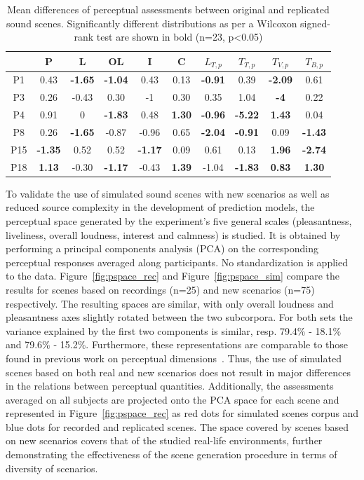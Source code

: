 \documentclass[11pt,a4paper]{article}
\begin{document}
\begin{table}[h]
\centering
\caption{Mean differences of perceptual assessments between original and replicated sound scenes. Significantly different distributions as per a Wilcoxon signed-rank test are shown in bold (n=23, p<0.05)}
\label{tab:ogrep}
\begin{tabular}{ c | c c c c c c c c c }
\hline
	 & P & L & OL & I & C & $L_{T, p}$ & $T_{T, p}$ & $T_{V, p}$ & $T_{B, p}$ \\ \hline
	P1 & 0.43 & \textbf{-1.65} & \textbf{-1.04} & 0.43 & 0.13 & \textbf{-0.91} & 0.39 & \textbf{-2.09} & 0.61 \\
	P3 & 0.26 & -0.43 & 0.30 & -1 & 0.30 & 0.35 & 1.04 & \textbf{-4} & 0.22 \\
	P4 & 0.91 & 0 & \textbf{-1.83} & 0.48 & \textbf{1.30} & \textbf{-0.96} & \textbf{-5.22} & \textbf{1.43} & 0.04 \\
	P8 & 0.26 & \textbf{-1.65} & -0.87 & -0.96 & 0.65 & \textbf{-2.04} & \textbf{-0.91} & 0.09 & \textbf{-1.43} \\
	P15 & \textbf{-1.35} & 0.52 & 0.52 & \textbf{-1.17} & 0.09 & 0.61 & 0.13 & \textbf{1.96} & \textbf{-2.74} \\
	P18 & \textbf{1.13} & -0.30 & \textbf{-1.17} & -0.43 & \textbf{1.39} & -1.04 & \textbf{-1.83} & \textbf{0.83} & \textbf{1.30} \\ \hline
\end{tabular}
\end{table}

To validate the use of simulated sound scenes with new scenarios as well as reduced source complexity in the development of prediction models, the perceptual space generated by the experiment's five general scales (pleasantness, liveliness, overall loudness, interest and calmness) is studied. It is obtained by performing a principal components analysis (PCA) on the corresponding perceptual responses averaged along participants. No standardization is applied to the data. Figure~\ref{fig:pspace_rec} and Figure~\ref{fig:pspace_sim} compare the results for scenes based on recordings (n=25) and new scenarios (n=75) respectively. The resulting spaces are similar, with only overall loudness and pleasantness axes slightly rotated between the two subcorpora. For both sets the variance explained by the first two components is similar, resp. 79.4\% - 18.1\% and 79.6\% - 15.2\%. Furthermore, these representations are comparable to those found in previous work on perceptual dimensions~\cite{axelsson2010, cain2013}. Thus, the use of simulated scenes based on both real and new scenarios does not result in major differences in the relations between perceptual quantities. Additionally, the assessments averaged on all subjects are projected onto the PCA space for each scene and represented in Figure~\ref{fig:pspace_rec} as red dots for simulated scenes corpus and blue dots for recorded and replicated scenes. The space covered by scenes based on new scenarios covers that of the studied real-life environments, further demonstrating the effectiveness of the scene generation procedure in terms of diversity of scenarios.
\end{document}
